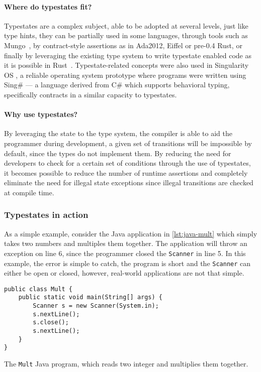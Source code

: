 \paragraph{Where do typestates fit?}
Typestates are a complex subject, able to be adopted at several levels,
just like type hints, they can be partially used in some languages,
through tools such as Mungo~\autocite{Voinea2020},
by contract-style assertions as in Ada2012, Eiffel or pre-0.4 Rust,
or finally by leveraging the existing type system to write typestate enabled code as it is possible in
Rust~\autocite{Duarte2020}.
Typestate-related concepts were also used in Singularity OS \autocite[Section 6]{Ancona2016},
a reliable operating system prototype where programs were written using Sing\# --- a language derived from C\# which supports behavioral typing,
specifically contracts in a similar capacity to typestates.

\paragraph{Why use typestates?}
By leveraging the state to the type system, the compiler is able to aid the programmer during development,
a given set of transitions will be impossible by default, since the types do not implement them.
By reducing the need for developers to check for a certain set of conditions through the use of typestates,
it becomes possible to reduce the number of runtime assertions and
completely eliminate the need for illegal state exceptions since illegal transitions are checked at compile time.


\subsubsection*{Typestates in action}

As a simple example, consider the Java application in \autoref{lst:java-mult} which simply takes two numbers and multiples them together.
The application will throw an exception on line 6,
since the programmer closed the \texttt{Scanner} in line 5.
In this example, the error is simple to catch,
the program is short and the \texttt{Scanner} can either be open or closed,
however, real-world applications are not that simple.

\begin{listing}
    \centering
    \begin{verbatim}
public class Mult {
    public static void main(String[] args) {
        Scanner s = new Scanner(System.in);
        s.nextLine();
        s.close();
        s.nextLine();
    }
}
    \end{verbatim}
    \caption{The \texttt{Mult} Java program, which reads two integer and multiplies them together.}
    \label{lst:java-mult}
\end{listing}

